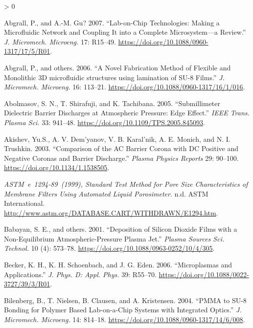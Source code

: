 \documentclass[
  10pt,
  twoside]{article}
\newlength{\cslhangindent}
\newenvironment{CSLReferences}[2] %
 {%
  \setlength{\parindent}{0pt}
  \ifodd #1 \everypar{\setlength{\hangindent}{\cslhangindent}}\ignorespaces\fi
  \ifnum #2 > 0
  \setlength{\parskip}{#2\baselineskip}
  \fi
 }%
 {}
\begin{document}
\hypertarget{refs}{}
\begin{CSLReferences}{1}{0}
\leavevmode\hypertarget{ref-EMPad20}{}%
Abgrall, P., and A.-M. Gu? 2007. {``Lab-on-Chip Technologies: Making a Microfluidic Network and Coupling It into a Complete Microsystem---a Review.''} \emph{J. Micromech. Microeng.} 17: R15--49. \url{https://doi.org/10.1088/0960-1317/17/5/R01}.

\leavevmode\hypertarget{ref-Abgr06}{}%
Abgrall, P., and others. 2006. {``A Novel Fabrication Method of Flexible and Monolithic {3D microfluidic structures using lamination of SU-8} Films.''} \emph{J. Micromech. Microeng.} 16: 113--21. \url{https://doi.org/10.1088/0960-1317/16/1/016}.

\leavevmode\hypertarget{ref-Abol05}{}%
Abolmasov, S. N., T. Shirafuji, and K. Tachibana. 2005. {``Submillimeter Dielectric Barrier Discharges at Atmospheric Pressure: Edge Effect.''} \emph{IEEE Trans. Plasma Sci.} 33: 941--48. \url{https://doi.org/10.1109/TPS.2005.845093}.

\leavevmode\hypertarget{ref-Akis03}{}%
Akishev, Yu.S., A. V. Dem'yanov, V. B. Karal'nik, A. E. Monich, and N. I. Trushkin. 2003. {``Comparison of the AC Barrier Corona with DC Positive and Negative Coronas and Barrier Discharge.''} \emph{Plasma Physics Reports} 29: 90--100. \url{https://doi.org/10.1134/1.1538505}.

\leavevmode\hypertarget{ref-ASTME1294}{}%
\emph{{ASTM}~e~1294-89~(1999), Standard Test Method for Pore Size Characteristics of Membrane Filters Using Automated Liquid Porosimeter}. n.d. ASTM International. \url{http://www.astm.org/DATABASE.CART/WITHDRAWN/E1294.htm}.

\leavevmode\hypertarget{ref-Baba01}{}%
Babayan, S. E., and others. 2001. {``Deposition of Silicon Dioxide Films with a Non-Equilibrium Atmospheric-Pressure Plasma Jet.''} \emph{Plasma Sources Sci. Technol.} 10 (4): 573--78. \url{https://doi.org/10.1088/0963-0252/10/4/305}.

\leavevmode\hypertarget{ref-Beck06}{}%
Becker, K. H., K. H. Schoenbach, and J. G. Eden. 2006. {``Microplasmas and Applications.''} \emph{J. Phys. D: Appl. Phys.} 39: R55--70. \url{https://doi.org/10.1088/0022-3727/39/3/R01}.

\leavevmode\hypertarget{ref-Bile04}{}%
Bilenberg, B., T. Nielsen, B. Clausen, and A. Kristensen. 2004. {``PMMA to SU-8 Bonding for Polymer Based Lab-on-a-Chip Systems with Integrated Optics.''} \emph{J. Micromech. Microeng.} 14: 814--18. \url{https://doi.org/10.1088/0960-1317/14/6/008}.


\end{CSLReferences}
\end{document}
